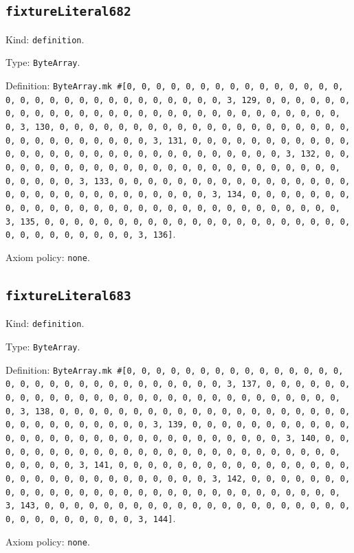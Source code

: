 \documentclass[11pt]{article}
\begin{document}
\subsection*{\texttt{fixtureLiteral682}}
\noindent Kind: \texttt{definition}.\par
\noindent Type: \texttt{ByteArray}.\par
\noindent Definition: \texttt{ByteArray.mk \#[0, 0, 0, 0, 0, 0, 0, 0, 0, 0, 0, 0, 0, 0, 0, 0, 0, 0, 0, 0, 0, 0, 0, 0, 0, 0, 0, 0, 0, 0, 3, 129, 0, 0, 0, 0, 0, 0, 0, 0, 0, 0, 0, 0, 0, 0, 0, 0, 0, 0, 0, 0, 0, 0, 0, 0, 0, 0, 0, 0, 0, 0, 3, 130, 0, 0, 0, 0, 0, 0, 0, 0, 0, 0, 0, 0, 0, 0, 0, 0, 0, 0, 0, 0, 0, 0, 0, 0, 0, 0, 0, 0, 0, 0, 3, 131, 0, 0, 0, 0, 0, 0, 0, 0, 0, 0, 0, 0, 0, 0, 0, 0, 0, 0, 0, 0, 0, 0, 0, 0, 0, 0, 0, 0, 0, 0, 3, 132, 0, 0, 0, 0, 0, 0, 0, 0, 0, 0, 0, 0, 0, 0, 0, 0, 0, 0, 0, 0, 0, 0, 0, 0, 0, 0, 0, 0, 0, 0, 3, 133, 0, 0, 0, 0, 0, 0, 0, 0, 0, 0, 0, 0, 0, 0, 0, 0, 0, 0, 0, 0, 0, 0, 0, 0, 0, 0, 0, 0, 0, 0, 3, 134, 0, 0, 0, 0, 0, 0, 0, 0, 0, 0, 0, 0, 0, 0, 0, 0, 0, 0, 0, 0, 0, 0, 0, 0, 0, 0, 0, 0, 0, 0, 3, 135, 0, 0, 0, 0, 0, 0, 0, 0, 0, 0, 0, 0, 0, 0, 0, 0, 0, 0, 0, 0, 0, 0, 0, 0, 0, 0, 0, 0, 0, 0, 3, 136]}.\par
\noindent Axiom policy: \texttt{none}.\par
\subsection*{\texttt{fixtureLiteral683}}
\noindent Kind: \texttt{definition}.\par
\noindent Type: \texttt{ByteArray}.\par
\noindent Definition: \texttt{ByteArray.mk \#[0, 0, 0, 0, 0, 0, 0, 0, 0, 0, 0, 0, 0, 0, 0, 0, 0, 0, 0, 0, 0, 0, 0, 0, 0, 0, 0, 0, 0, 0, 3, 137, 0, 0, 0, 0, 0, 0, 0, 0, 0, 0, 0, 0, 0, 0, 0, 0, 0, 0, 0, 0, 0, 0, 0, 0, 0, 0, 0, 0, 0, 0, 3, 138, 0, 0, 0, 0, 0, 0, 0, 0, 0, 0, 0, 0, 0, 0, 0, 0, 0, 0, 0, 0, 0, 0, 0, 0, 0, 0, 0, 0, 0, 0, 3, 139, 0, 0, 0, 0, 0, 0, 0, 0, 0, 0, 0, 0, 0, 0, 0, 0, 0, 0, 0, 0, 0, 0, 0, 0, 0, 0, 0, 0, 0, 0, 3, 140, 0, 0, 0, 0, 0, 0, 0, 0, 0, 0, 0, 0, 0, 0, 0, 0, 0, 0, 0, 0, 0, 0, 0, 0, 0, 0, 0, 0, 0, 0, 3, 141, 0, 0, 0, 0, 0, 0, 0, 0, 0, 0, 0, 0, 0, 0, 0, 0, 0, 0, 0, 0, 0, 0, 0, 0, 0, 0, 0, 0, 0, 0, 3, 142, 0, 0, 0, 0, 0, 0, 0, 0, 0, 0, 0, 0, 0, 0, 0, 0, 0, 0, 0, 0, 0, 0, 0, 0, 0, 0, 0, 0, 0, 0, 3, 143, 0, 0, 0, 0, 0, 0, 0, 0, 0, 0, 0, 0, 0, 0, 0, 0, 0, 0, 0, 0, 0, 0, 0, 0, 0, 0, 0, 0, 0, 0, 3, 144]}.\par
\noindent Axiom policy: \texttt{none}.\par
\end{document}
